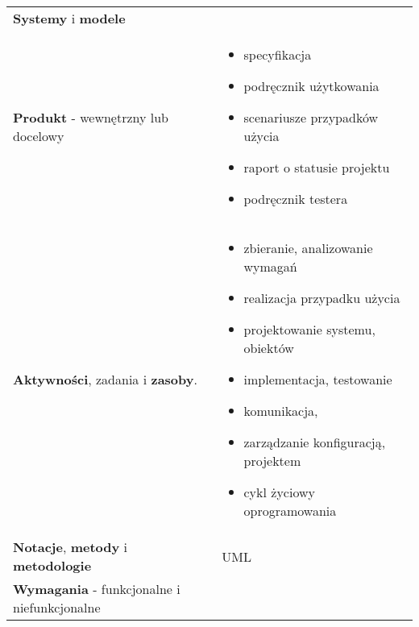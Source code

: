 \documentclass[../main.tex]{subfiles}
\begin{document}
\begin{table}[H]
\begin{center}
\begin{tabular}{  p{8cm} p{8cm}  }
                \textbf{Systemy} i \textbf{modele} & \\
                \cmidrule(r){1-1}\cmidrule(l){2-2}
                \textbf{Produkt} - wewnętrzny lub docelowy
                &
                \begin{itemize}
                    \item specyfikacja
                    \item podręcznik użytkowania
                    \item scenariusze przypadków użycia
                    \item raport o statusie projektu
                    \item podręcznik testera
                \end{itemize}
                \\
                \cmidrule(r){1-1}\cmidrule(l){2-2}
                \textbf{Aktywności}, zadania i \textbf{zasoby}.
                &
                \begin{itemize}
                    \item zbieranie, analizowanie wymagań
                    \item realizacja przypadku użycia
                    \item projektowanie systemu, obiektów
                    \item implementacja, testowanie
                    \item komunikacja,
                    \item zarządzanie konfiguracją, projektem
                    \item cykl życiowy oprogramowania
                \end{itemize}
                \\
                \cmidrule(r){1-1}\cmidrule(l){2-2}
                \textbf{Notacje}, \textbf{metody} i \textbf{metodologie}
                &
                UML
                \\

                \textbf{Wymagania} - funkcjonalne i niefunkcjonalne & \\

            \end{tabular}
        \end{center}
    \end{table}
\end{document}
